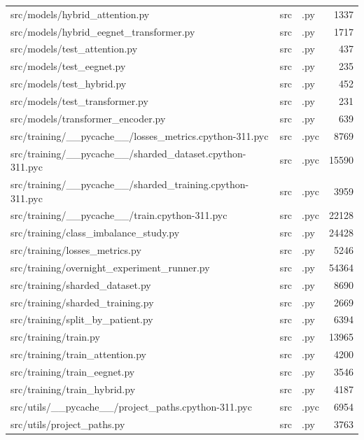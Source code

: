 \begin{tabular}{lllr}
src/models/hybrid\_attention.py & src & .py & 1337 \\
src/models/hybrid\_eegnet\_transformer.py & src & .py & 1717 \\
src/models/test\_attention.py & src & .py & 437 \\
src/models/test\_eegnet.py & src & .py & 235 \\
src/models/test\_hybrid.py & src & .py & 452 \\
src/models/test\_transformer.py & src & .py & 231 \\
src/models/transformer\_encoder.py & src & .py & 639 \\
src/training/\_\_pycache\_\_/losses\_metrics.cpython-311.pyc & src & .pyc & 8769 \\
src/training/\_\_pycache\_\_/sharded\_dataset.cpython-311.pyc & src & .pyc & 15590 \\
src/training/\_\_pycache\_\_/sharded\_training.cpython-311.pyc & src & .pyc & 3959 \\
src/training/\_\_pycache\_\_/train.cpython-311.pyc & src & .pyc & 22128 \\
src/training/class\_imbalance\_study.py & src & .py & 24428 \\
src/training/losses\_metrics.py & src & .py & 5246 \\
src/training/overnight\_experiment\_runner.py & src & .py & 54364 \\
src/training/sharded\_dataset.py & src & .py & 8690 \\
src/training/sharded\_training.py & src & .py & 2669 \\
src/training/split\_by\_patient.py & src & .py & 6394 \\
src/training/train.py & src & .py & 13965 \\
src/training/train\_attention.py & src & .py & 4200 \\
src/training/train\_eegnet.py & src & .py & 3546 \\
src/training/train\_hybrid.py & src & .py & 4187 \\
src/utils/\_\_pycache\_\_/project\_paths.cpython-311.pyc & src & .pyc & 6954 \\
src/utils/project\_paths.py & src & .py & 3763 \\
\bottomrule
\end{tabular}
